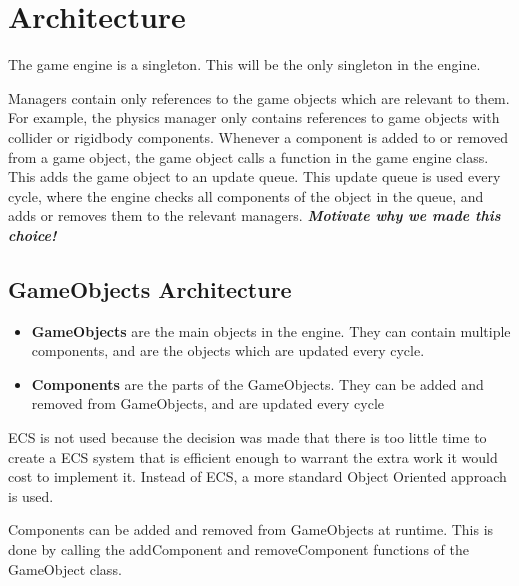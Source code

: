 \section{Architecture}
The game engine is a singleton. This will be the only singleton in the engine.

Managers contain only references to the game objects which are relevant to them. For example, the physics manager only contains references to game objects with collider or rigidbody components.
Whenever a component is added to or removed from a game object, the game object calls a function in the game engine class. This adds the game object to an update queue. This update queue is used every cycle, where the engine checks all components of the object in the queue, and adds or removes them to the relevant managers.
\textbf{\textit{Motivate why we made this choice!}}

\subsection{GameObjects Architecture}
\begin{itemize}
    \item \textbf{GameObjects} are the main objects in the engine. They can contain multiple components, and are the objects which are updated every cycle.
    \item \textbf{Components} are the parts of the GameObjects. They can be added and removed from GameObjects, and are updated every cycle
\end{itemize}
ECS is not used because the decision was made that there is too little time to create a ECS system that is efficient enough to warrant the extra work it would cost to implement it.
Instead of ECS, a more standard Object Oriented approach is used.

Components can be added and removed from GameObjects at runtime. This is done by calling the addComponent and removeComponent functions of the GameObject class.